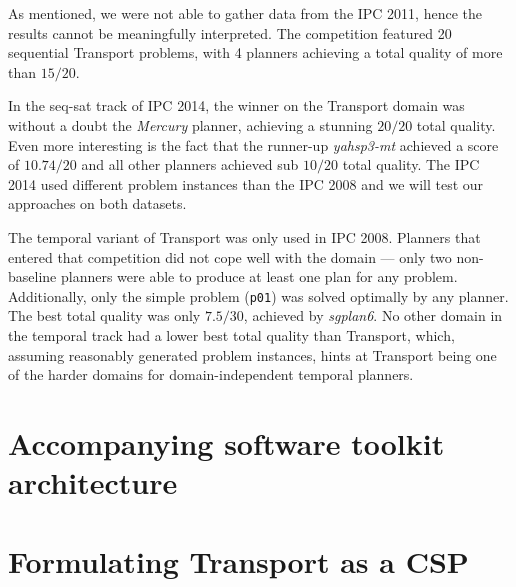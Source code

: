 As mentioned, we were not able to gather data from the IPC 2011,
hence the results cannot be meaningfully interpreted.
The competition featured 20 sequential Transport problems,
with 4 planners achieving a total quality of more than $15/20$.

In the seq-sat track of IPC 2014, the winner on the Transport domain
was without a doubt the \textit{Mercury} planner, achieving
a stunning $20/20$ total quality. Even more interesting is the fact that
the runner-up \textit{yahsp3-mt} achieved a score of $10.74/20$
and all other planners achieved sub $10/20$ total quality.
The IPC 2014 used different problem instances than the IPC 2008
and we will test our approaches on both datasets.

The temporal variant of Transport was only used in IPC 2008.
Planners that entered that competition did not cope well with the domain
--- only two non-baseline planners were able to produce at least one plan
for any problem. Additionally, only the simple problem (\verb+p01+) was solved
optimally by any planner. The best total quality was only $7.5/30$, achieved by
\textit{sgplan6}. No other domain in the temporal track had a lower best total quality
than Transport, which, assuming reasonably generated problem instances, hints
at Transport being one of the harder domains for domain-independent temporal planners.

















\section{Accompanying software toolkit architecture}



















\section{Formulating Transport as a CSP}\label{csp-formulation}

